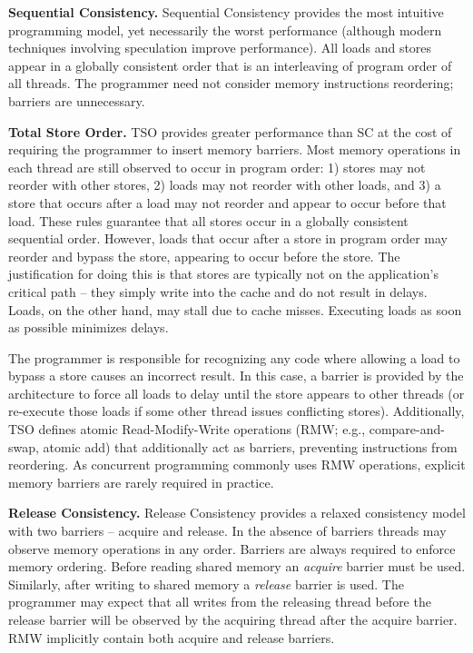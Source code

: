 \textbf{Sequential Consistency.}
Sequential Consistency \cite{Lamport79} provides the most intuitive programming model, yet necessarily the worst performance (although modern techniques involving speculation improve performance).
All loads and stores appear in a globally consistent order that is an interleaving of program order of all threads.
The programmer need not consider memory instructions reordering; barriers are unnecessary.

\textbf{Total Store Order.}
TSO \cite{SPARCv9} provides greater performance than SC at the cost of requiring the programmer to insert memory barriers.
Most memory operations in each thread are still observed to occur in program order: 1) stores may not reorder with other stores, 2) loads may not reorder with other loads, and 3) a store that occurs after a load may not reorder and appear to occur before that load.
These rules guarantee that all stores occur in a globally consistent sequential order.
However, loads that occur after a store in program order may reorder and bypass the store, appearing to occur before the store.
The justification for doing this is that stores are typically not on the application's critical path -- they simply write into the cache and do not result in delays.
Loads, on the other hand, may stall due to cache misses.
Executing loads as soon as possible minimizes delays.

The programmer is responsible for recognizing any code where allowing a load to bypass a store causes an incorrect result.
In this case, a barrier is provided by the architecture to force all loads to delay until the store appears to other threads (or re-execute those loads if some other thread issues conflicting stores).
Additionally, TSO defines atomic Read-Modify-Write operations (RMW; e.g., compare-and-swap, atomic add) that additionally act as barriers, preventing instructions from reordering.
As concurrent programming commonly uses RMW operations, explicit memory barriers are rarely required in practice.

\textbf{Release Consistency.}
Release Consistency \cite{GharachorlooLenoski90} provides a relaxed consistency model with two barriers -- acquire and release.
In the absence of barriers threads may observe memory operations in any order.
Barriers are always required to enforce memory ordering.
Before reading shared memory an \emph{acquire} barrier must be used.
Similarly, after writing to shared memory a \emph{release} barrier is used.
The programmer may expect that all writes from the releasing thread before the release barrier will be observed by the acquiring thread after the acquire barrier.
RMW implicitly contain both acquire and release barriers.

